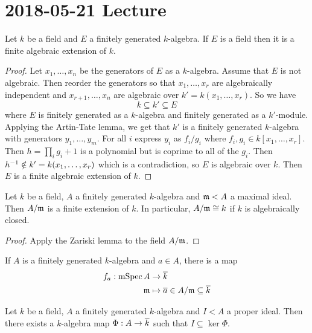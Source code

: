 \section{2018-05-21 Lecture}

\begin{thm}
  Let $k$ be a field and $E$ a finitely generated $k$-algebra.
  If $E$ is a field then it is a finite algebraic extension of $k$.
\end{thm}

\begin{proof}
  Let $x_1,\ldots,x_n$ be the generators of $E$ as a $k$-algebra.
  Assume that $E$ is not algebraic.
  Then reorder the generators so that $x_1,\ldots,x_r$ are algebraically independent and $x_{r+1},\ldots,x_n$ are algebraic over $k'=k(x_1,\ldots,x_r)$.
  So we have
  \[ k \subseteq k' \subseteq E \]
  where $E$ is finitely generated as a $k$-algebra and finitely generated as a $k'$-module.
  Applying the Artin-Tate lemma, we get that $k'$ is a finitely generated $k$-algebra with generators $y_1,\ldots,y_m$.
  For all $i$ express $y_i$ as $f_i/g_i$ where $f_i,g_i \in k[x_1,\ldots,x_r]$.
  Then $h = \prod_i g_i + 1$ is a polynomial but is coprime to all of the $g_i$.
  Then $h^{-1} \notin k'=k(x_1,\ldots,x_r)$ which is a contradiction, so $E$ is algebraic over $k$.
  Then $E$ is a finite algebraic extension of $k$.
\end{proof}

\begin{thm}
  Let $k$ be a field, $A$ a finitely generated $k$-algebra and $\mathfrak{m}<A$ a maximal ideal.
  Then $A/\mathfrak{m}$ is a finite extension of $k$.
  In particular, $A/\mathfrak{m} \cong k$ if $k$ is algebraically closed.
\end{thm}

\begin{proof}
  Apply the Zariski lemma to the field $A/\mathfrak{m}$.
\end{proof}

\begin{rmk}
  If $A$ is a finitely generated $k$-algebra and $a \in A$, there is a map
  \begin{align*}
    f_a: \operatorname{mSpec} A &\to \overline k \\
    \mathfrak{m} &\mapsto \overline a \in A/\mathfrak{m} \subseteq \overline k
  \end{align*}
\end{rmk}

\begin{cor}[3.25]
  Let $k$ be a field, $A$ a finitely generated $k$-algebra and $I<A$ a proper ideal.
  Then there exists a $k$-algebra map $\Phi: A \to \overline k$ such that $I \subseteq \ker \Phi$.
\end{cor}

